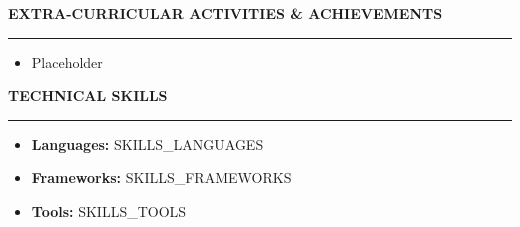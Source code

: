 \documentclass[10pt]{article}
\newcommand{\resheading}[1]{\vspace{8pt} \noindent \textcolor{accentblue}{\textbf{\large\scshape{#1}}} \vspace{2pt} {\color{accentblue!30}\hrule} \vspace{5pt}}
\begin{document}
\resheading{EXTRA-CURRICULAR ACTIVITIES \& ACHIEVEMENTS}
\begin{itemize}
\item Placeholder
\end{itemize}

\resheading{TECHNICAL SKILLS}
\begin{itemize}
\item \textbf{Languages:} {{SKILLS_LANGUAGES}}
\item \textbf{Frameworks:} {{SKILLS_FRAMEWORKS}}
\item \textbf{Tools:} {{SKILLS_TOOLS}}
\end{itemize}
\end{document}
